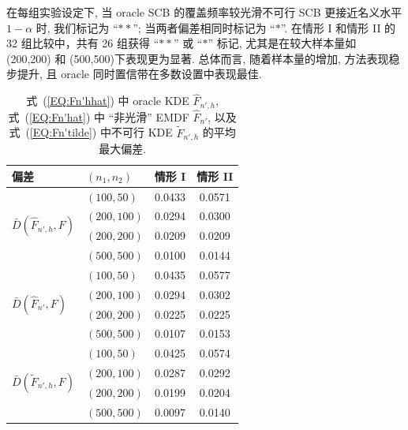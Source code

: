 \documentclass[a4paper,openay,14pt]{ctexbook}
\numberwithin{equation}{section}
\numberwithin{lem}{section}
\begin{document}
在每组实验设定下, 当 oracle SCB 的覆盖频率较光滑不可行 SCB 更接近名义水平 \(1-\alpha\) 时, 我们标记为 “$\ast\ast$”; 当两者偏差相同时标记为 “$\ast$”. 在情形 I 和情形 II 的 32 组比较中，共有 26 组获得 “$\ast\ast$” 或 “$\ast$” 标记, 尤其是在较大样本量如 (200,200) 和 (500,500)下表现更为显著. 总体而言, 随着样本量的增加, 方法表现稳步提升, 且 oracle 同时置信带在多数设置中表现最佳.
{
\setlength{\tabcolsep}{10pt}
\renewcommand{\arraystretch}{1.3}
\begin{table}[htbp]
    \centering
    \caption{式~(\ref{EQ:Fn'hhat}) 中 oracle KDE $\hat{F}_{n',h}$, 式~(\ref{EQ:Fn'hat}) 中 ``非光滑'' EMDF $\hat{F}_{n'}$, 以及式~(\ref{EQ:Fn'tilde}) 中不可行 KDE $\tilde{F}_{n',h}$ 的平均最大偏差.
}
    \label{tab:Dbar}
    \begin{tabular}{llcc}
        \toprule
        偏差 & $(n_1,n_2)$ & 情形 I & 情形 II \\
        \midrule
        \multirow{4}{*}{$\bar{D}(\hat{F}_{n',h},F)$} 
            & $(100,50)$    & 0.0433 & 0.0571\\
            & $(200,100)$   & 0.0294 & 0.0300 \\
            & $(200,200)$   & 0.0209 & 0.0209 \\
            & $(500,500)$   & 0.0100 & 0.0144 \\
        \midrule
        \multirow{4}{*}{$\bar{D}(\hat{F}_{n'},F)$} 
            & $(100,50)$    & 0.0435 & 0.0577\\
            & $(200,100)$   & 0.0294 & 0.0302 \\
            & $(200,200)$   & 0.0225 & 0.0225 \\
            & $(500,500)$   & 0.0107 & 0.0153\\
        \midrule
        \multirow{4}{*}{$\bar{D}(\tilde{F}_{n',h},F)$} 
            & $(100,50)$    & 0.0425 & 0.0574 \\
            & $(200,100)$   & 0.0287 & 0.0292 \\
            & $(200,200)$   & 0.0199 & 0.0204 \\
            & $(500,500)$   & 0.0097 & 0.0140\\
        \bottomrule
    \end{tabular}
\end{table}
}
\end{document}
